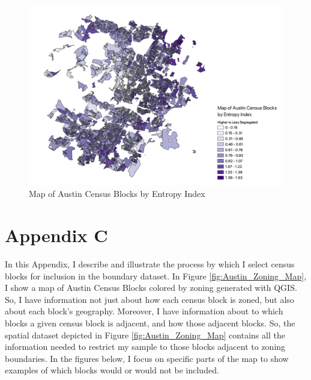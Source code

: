 \documentclass[11pt]{article}
\begin{document}
\begin{figure}[H]
    \centering
    \includegraphics[width=\textwidth]{H-map_monochrome_legendFIXED.pdf}
    \caption{Map of Austin Census Blocks by Entropy Index}
    \label{fig:H_map_blocks}
\end{figure}


\pagebreak
\section*{Appendix C} 
\setcounter{table}{0}
\renewcommand{\thetable}{C\arabic{table}}
\setcounter{figure}{0}
\renewcommand{\thefigure}{C\arabic{figure}}

In this Appendix, I describe and illustrate the process by which I select census blocks for inclusion in the boundary dataset. In Figure \ref{fig:Austin_Zoning_Map}, I show a map of Austin Census Blocks colored by zoning generated with QGIS. So, I have information not just about how each census block is zoned, but also about each block's geography. Moreover, I have information about to which blocks a given census block is adjacent, and how those adjacent blocks. So, the spatial dataset depicted in Figure \ref{fig:Austin_Zoning_Map} contains all the information needed to restrict my sample to those blocks adjacent to zoning boundaries. In the figures below, I focus on specific parts of the map to show examples of which blocks would or would not be included.
\end{document}
